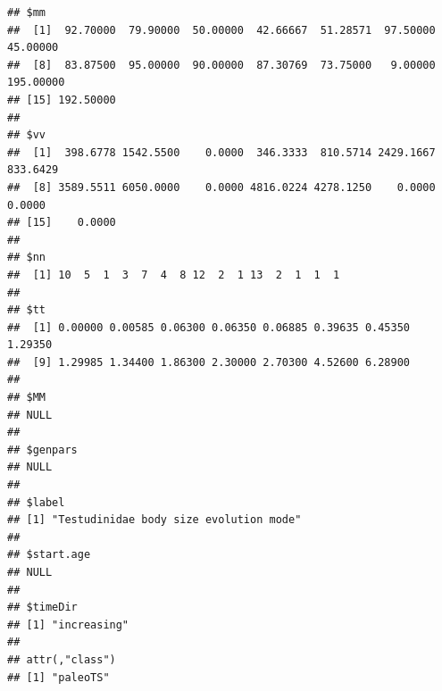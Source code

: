 \documentclass[]{article}
\newenvironment{Shaded}{\begin{snugshade}}{\end{snugshade}}
\newcommand{\KeywordTok}[1]{\textcolor[rgb]{0.13,0.29,0.53}{\textbf{{#1}}}}
\newcommand{\DataTypeTok}[1]{\textcolor[rgb]{0.13,0.29,0.53}{{#1}}}
\newcommand{\DecValTok}[1]{\textcolor[rgb]{0.00,0.00,0.81}{{#1}}}
\newcommand{\StringTok}[1]{\textcolor[rgb]{0.31,0.60,0.02}{{#1}}}
\newcommand{\CommentTok}[1]{\textcolor[rgb]{0.56,0.35,0.01}{\textit{{#1}}}}
\newcommand{\OtherTok}[1]{\textcolor[rgb]{0.56,0.35,0.01}{{#1}}}
\newcommand{\NormalTok}[1]{{#1}}
\begin{document}
\begin{Shaded}
\end{Shaded}

\begin{verbatim}
## $mm
##  [1]  92.70000  79.90000  50.00000  42.66667  51.28571  97.50000  45.00000
##  [8]  83.87500  95.00000  90.00000  87.30769  73.75000   9.00000 195.00000
## [15] 192.50000
## 
## $vv
##  [1]  398.6778 1542.5500    0.0000  346.3333  810.5714 2429.1667  833.6429
##  [8] 3589.5511 6050.0000    0.0000 4816.0224 4278.1250    0.0000    0.0000
## [15]    0.0000
## 
## $nn
##  [1] 10  5  1  3  7  4  8 12  2  1 13  2  1  1  1
## 
## $tt
##  [1] 0.00000 0.00585 0.06300 0.06350 0.06885 0.39635 0.45350 1.29350
##  [9] 1.29985 1.34400 1.86300 2.30000 2.70300 4.52600 6.28900
## 
## $MM
## NULL
## 
## $genpars
## NULL
## 
## $label
## [1] "Testudinidae body size evolution mode"
## 
## $start.age
## NULL
## 
## $timeDir
## [1] "increasing"
## 
## attr(,"class")
## [1] "paleoTS"
\end{verbatim}
\end{document}
